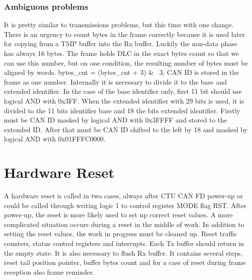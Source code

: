 \documentclass{ctuthesis}
\begin{document}
  \subsubsection{Ambiguous problems}
   It is pretty similar to transmissions problems, but this time with one change. There is an urgency to count bytes in the frame correctly because it is used later for copying from a TMP buffer into the Rx buffer. Luckily the non-data phase has always 16 bytes. The frame holds DLC in the exact bytes count so that we can use this number, but on one condition, the resulting number of bytes must be aligned by words.
   bytes\_cnt = (bytes\_cnt + 3) \& ~3;
   CAN ID is stored in the frame as one number. Internally it is necessary to divide it to the base and extended identifier. In the case of the base identifier only, first 11 bit should use logical AND with 0x3FF. When the extended identifier with 29 bits is used, it is divided to the 11 bits identifier base and 18 the bits extended identifier. Firstly must be CAN ID masked by logical AND with 0x3FFFF and stored to the extended ID. After that must be CAN ID shifted to the left by 18 and masked by logical AND with 0x01FFFC0000.
  
 \section{Hardware Reset}
  A hardware reset is called in two cases, always after CTU CAN FD power-up or could be called through writing logic 1 to control register MODE flag RST. After power-up, the reset is more likely used to set up correct reset values. A more complicated situation occurs during a reset in the middle of work. In addition to setting the reset values, the work in progress must be cleaned up. Reset traffic counters, status control registers and interrupts. Each Tx buffer should return in the empty state. It is also necessary to flush Rx buffer. It contains several steps, reset tail position pointer, buffer bytes count and for a case of reset during frame reception also frame reminder.
 
\end{document}
